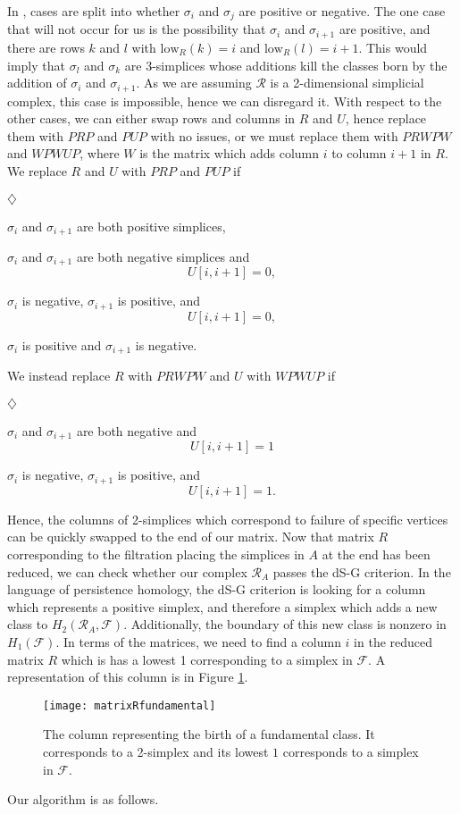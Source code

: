 \documentclass[10pt,twocolumn]{article} \usepackage{amsmath,epsf,amssymb,cite,pifont,amsthm, mathrsfs,epsfig,  bbm, amsthm,  setspace}
\newcommand{\FF}{\mathcal F}
\newcommand{\RR}{\mathcal R}
\renewcommand{\1}{\mathbbm{1}}
\newcommand{\low}{\textrm{low}}
\begin{document}
In \cite{Cohen-Steiner2006}, cases are split into whether $\sigma_i$ and $\sigma_j$ are positive or negative.
The one case that will not occur for us is the possibility that $\sigma_i$ and $\sigma_{i+1}$ are positive,
and there are rows $k$ and $l$ with $\low_R(k)=i$ and $\low_R(l)=i+1$.
This would imply that $\sigma_l$ and $\sigma_k$ are 3-simplices whose additions kill the classes
born by the addition of $\sigma_i$ and $\sigma_{i+1}$.
As we are assuming $\RR$ is a 2-dimensional simplicial complex, this case is impossible, hence we can disregard it.
With respect to the other cases, we can either swap rows and columns in $R$ and $U$,
hence replace them with $PRP$ and $PUP$ with no issues, or we must replace them with $PRWPW$
and $WPWUP$, where $W$ is the matrix which adds column $i$ to column $i+1$ in $R$.
We replace $R$ and $U$ with $PRP$ and $PUP$ if
\begin{list}{$\diamondsuit$}{}
\item $\sigma_i$ and $\sigma_{i+1}$ are both positive simplices,
\item $\sigma_i$ and $\sigma_{i+1}$ are both negative simplices and $$U[i,i+1]=0,$$
\item $\sigma_i$ is negative, $\sigma_{i+1}$ is positive, and $$U[i,i+1]=0,$$\item $\sigma_i$ is positive and $\sigma_{i+1}$ is negative.
\end{list}
We instead replace $R$ with $PRWPW$ and $U$ with $WPWUP$ if
\begin{list}{$\diamondsuit$}{}
\item $\sigma_i$ and $\sigma_{i+1}$ are both negative and $$U[i,i+1]=1$$ \item $\sigma_i$ is negative, $\sigma_{i+1}$ is positive, and $$U[i,i+1]=1.$$
\end{list}
Hence,  the columns of  2-simplices which correspond to failure of specific vertices can be quickly swapped to the end of our matrix.
Now that matrix $R$ corresponding to the filtration placing the simplices in $A$ at the end has been reduced, we can check whether our complex $\RR_A$ passes the dS-G criterion.
In the language of persistence homology, the dS-G criterion is looking for a column which represents a positive simplex, and therefore a simplex which adds a new class to  $H_2(\RR_A,\FF)$.
Additionally, the boundary of this new class is nonzero in $H_1(\FF)$.
In terms of the matrices, we need to find a column $i$ in the reduced matrix $R$ which is   has a lowest 1 corresponding to a simplex in $\FF$.
A representation of this column is in Figure \ref{F: matrixRfundamental}.
\begin{figure}
\begin{center}
\texttt{[image: matrixRfundamental]}
\end{center}
\caption{The column representing the birth of a fundamental class. It corresponds to a 2-simplex and its lowest
$1$ corresponds to a simplex in $\FF$.} \label{F: matrixRfundamental}
\end{figure}
Our algorithm is as follows.
\end{document}
